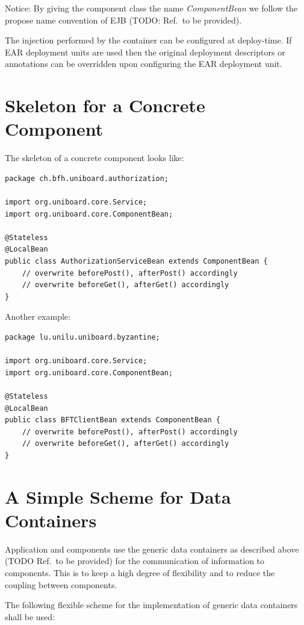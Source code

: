 \documentclass[oneside]{scrreprt}
\begin{document}
Notice: By giving the component class the name \emph{ComponentBean}
we follow the propose name convention of EJB (TODO: Ref.\ to be
provided).

The injection performed by the container can be configured at
deploy-time. If EAR deployment units are used then the original
deployment descriptors or annotations can be overridden upon
configuring the EAR deployment unit.


\section{Skeleton for a Concrete Component}

The skeleton of a concrete component looks like:

\begin{lstlisting}
package ch.bfh.uniboard.authorization;

import org.uniboard.core.Service;
import org.uniboard.core.ComponentBean;

@Stateless
@LocalBean
public class AuthorizationServiceBean extends ComponentBean {
    // overwrite beforePost(), afterPost() accordingly
    // overwrite beforeGet(), afterGet() accordingly
}
\end{lstlisting}

Another example:

\begin{lstlisting}
package lu.unilu.uniboard.byzantine;

import org.uniboard.core.Service;
import org.uniboard.core.ComponentBean;

@Stateless
@LocalBean
public class BFTClientBean extends ComponentBean {
    // overwrite beforePost(), afterPost() accordingly
    // overwrite beforeGet(), afterGet() accordingly
}
\end{lstlisting}


\section{A Simple Scheme for Data Containers}\label{sec:data-container}

Application and components use the generic data containers
as described above (TODO Ref.\ to be provided) for the
communication of information to components. This is to keep a high
degree of flexibility and to reduce the coupling between
components.

The following flexible scheme for the implementation of generic
data containers shall be used:
\end{document}
